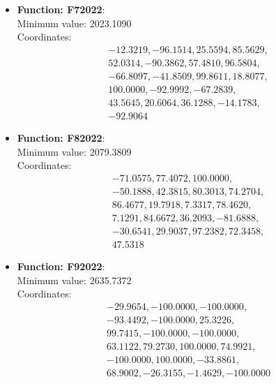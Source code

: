 \documentclass{article}
\begin{document}
\begin{itemize}
    \item \textbf{Function: F72022}: \\
      Minimum value: 2023.1090 \\
      Coordinates:
      \[
        \begin{aligned}
          & -12.3219, -96.1514, 25.5594, 85.5629, \\
          & 52.0314, -90.3862, 57.4810, 96.5804, \\
          & -66.8097, -41.8509, 99.8611, 18.8077, \\
          & 100.0000, -92.9992, -67.2839, \\
          & 43.5645, 20.6064, 36.1288, -14.1783, \\
          & -92.9064
        \end{aligned}
      \]

    \item \textbf{Function: F82022}: \\
      Minimum value: 2079.3809 \\
      Coordinates:
      \[
        \begin{aligned}
          & -71.0575, 77.4072, 100.0000, \\
          & -50.1888, 42.3815, 80.3013, 74.2704, \\
          & 86.4677, 19.7918, 7.3317, 78.4620, \\
          & 7.1291, 84.6672, 36.2093, -81.6888, \\
          & -30.6541, 29.9037, 97.2382, 72.3458, \\
          & 47.5318
        \end{aligned}
      \]

    \item \textbf{Function: F92022}: \\
      Minimum value: 2635.7372 \\
      Coordinates:
      \[
        \begin{aligned}
          & -29.9654, -100.0000, -100.0000, \\
          & -93.4492, -100.0000, 25.3226, \\
          & 99.7415, -100.0000, -100.0000, \\
          & 63.1122, 79.2730, 100.0000, 74.9921, \\
          & -100.0000, 100.0000, -33.8861, \\
          & 68.9002, -26.3155, -1.4629, -100.0000
        \end{aligned}
      \]


\end{itemize}
\end{document}
